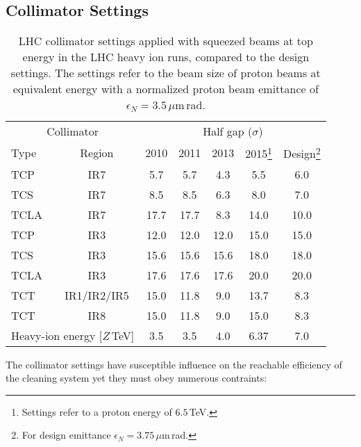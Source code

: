 \subsection{Collimator Settings}
%
\begin{table}[b]
\caption{LHC collimator settings applied with squeezed beams at top energy in the LHC heavy ion runs, compared to the design settings. The settings refer to the beam size of proton beams at equivalent energy with a normalized proton beam emittance of $\epsilon_N = 3.5\,\mu$m$\,$rad. }
%
\small
\begin{center}
\begin{minipage}{10cm}
\begin{tabular}{lcccccc}
\toprule
\midrule
 \multicolumn{2}{c}{Collimator} & \multicolumn{5}{c}{Half gap ($\sigma$)} \\
Type & Region & 2010 & 2011 & 2013 & 2015\footnote{Settings refer to a proton energy of $6.5\,$TeV.} & Design\footnote{For design emittance $\epsilon_N=3.75\,\mu$m$\,$rad.} \\ \midrule
TCP  & IR7 & 5.7  & 5.7  & 4.3     & 5.5  & 6.0  \\
TCS  & IR7 & 8.5  & 8.5  & 6.3     & 8.0  & 7.0  \\
TCLA & IR7 & 17.7 & 17.7 & 8.3     & 14.0 & 10.0 \\ \midrule
TCP  & IR3 & 12.0 & 12.0 & 12.0    & 15.0 & 15.0 \\
TCS  & IR3 & 15.6 & 15.6 & 15.6    & 18.0 & 18.0 \\
TCLA & IR3 & 17.6 & 17.6 & 17.6    & 20.0 & 20.0 \\ \midrule
TCT  & IR1/IR2/IR5        & 15.0 & 11.8 &  9.0 & 13.7& 8.3  \\         
TCT  & IR8                & 15.0 & 11.8 &  9.0 & 15.0& 8.3  \\ \midrule \midrule
\multicolumn{2}{c}{Heavy-ion energy [$Z\,$TeV]} & 3.5 & 3.5 & 4.0 & 6.37& 7.0 \\
\bottomrule
\end{tabular}
\end{minipage}
\end{center}
\label{tab:14070901}
\end{table}
%
The collimator settings have susceptible influence on the reachable efficiency of the cleaning system yet they must obey numerous contraints:
